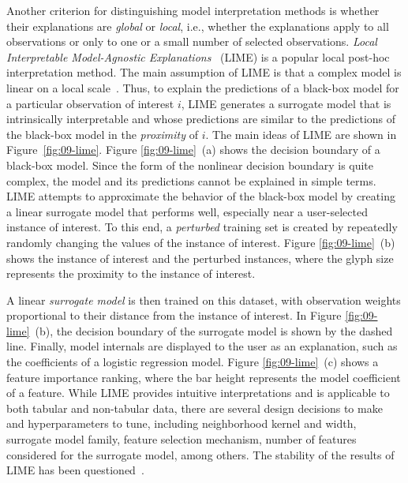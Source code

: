 \documentclass[
  oneside]{book}
\begin{document}
Another criterion for distinguishing model interpretation methods is whether their explanations are \emph{global} or \emph{local}, i.e., whether the explanations apply to all observations or only to one or a small number of selected observations.
\emph{Local Interpretable Model-Agnostic Explanations}~\autocite{RibeiroEtAl:KDD2016} (LIME) is a popular local post-hoc interpretation method.
The main assumption of LIME is that a complex model is linear on a local scale~\autocite{RibeiroEtAl:KDD2016}.
Thus, to explain the predictions of a black-box model for a particular observation of interest \(i\), LIME generates a surrogate model that is intrinsically interpretable and whose predictions are similar to the predictions of the black-box model in the \emph{proximity} of \(i\).
The main ideas of LIME are shown in Figure~\ref{fig:09-lime}.
Figure \ref{fig:09-lime}~(a) shows the decision boundary of a black-box model.
Since the form of the nonlinear decision boundary is quite complex, the model and its predictions cannot be explained in simple terms.
LIME attempts to approximate the behavior of the black-box model by creating a linear surrogate model that performs well, especially near a user-selected instance of interest.
To this end, a \emph{perturbed} training set is created by repeatedly randomly changing the values of the instance of interest.
Figure \ref{fig:09-lime}~(b) shows the instance of interest and the perturbed instances, where the glyph size represents the proximity to the instance of interest.

A linear \emph{surrogate model} is then trained on this dataset, with observation weights proportional to their distance from the instance of interest.
In Figure \ref{fig:09-lime}~(b), the decision boundary of the surrogate model is shown by the dashed line.
Finally, model internals are displayed to the user as an explanation, such as the coefficients of a logistic regression model.
Figure \ref{fig:09-lime}~(c) shows a feature importance ranking, where the bar height represents the model coefficient of a feature.
While LIME provides intuitive interpretations and is applicable to both tabular and non-tabular data, there are several design decisions to make and hyperparameters to tune, including neighborhood kernel and width, surrogate model family, feature selection mechanism, number of features considered for the surrogate model, among others.
The stability of the results of LIME has been questioned~\autocite{alvarez2018robustness,visani2020optilime}.
\end{document}
